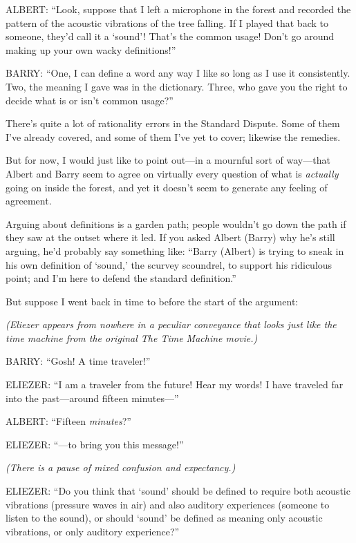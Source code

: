 {
 ALBERT: ``Look, suppose that I left a microphone
in the forest and recorded the pattern of the acoustic vibrations of
the tree falling. If I played that back to someone,
they'd call it a
`sound'! That's the
common usage! Don't go around making up your own wacky
definitions!''}

{
 BARRY: ``One, I can define a word any way I like
so long as I use it consistently. Two, the meaning I gave was in the
dictionary. Three, who gave you the right to decide what is or
isn't common usage?''}

{
 There's quite a lot of rationality errors in the
Standard Dispute. Some of them I've already covered,
and some of them I've yet to cover; likewise the
remedies.}

{
 But for now, I would just like to point out---in a mournful sort
of way---that Albert and Barry seem to agree on virtually every
question of what is \textit{actually} going on inside the forest, and
yet it doesn't seem to generate any feeling of
agreement.}

{
 Arguing about definitions is a garden path; people
wouldn't go down the path if they saw at the outset
where it led. If you asked Albert (Barry) why he's
still arguing, he'd probably say something like:
``Barry (Albert) is trying to sneak in his own
definition of `sound,' the scurvey
scoundrel, to support his ridiculous point; and I'm
here to defend the standard definition.''}

{
 But suppose I went back in time to before the start of the
argument:}

{
 \textit{(Eliezer appears from nowhere in a peculiar conveyance
that looks just like the time machine from the original The Time
Machine movie.)}}

{
 BARRY: ``Gosh! A time
traveler!''}

{
 ELIEZER: ``I am a traveler from the future! Hear
my words! I have traveled far into the past---around fifteen
minutes---''}

{
 ALBERT: ``Fifteen
\textit{minutes}?''}

{
 ELIEZER: ``---to bring you this
message!''}

{
 \textit{(There is a pause of mixed confusion and expectancy.)}}

{
 ELIEZER: ``Do you think that
`sound' should be defined to require
both acoustic vibrations (pressure waves in air) and also auditory
experiences (someone to listen to the sound), or should
`sound' be defined as meaning only
acoustic vibrations, or only auditory experience?''}

